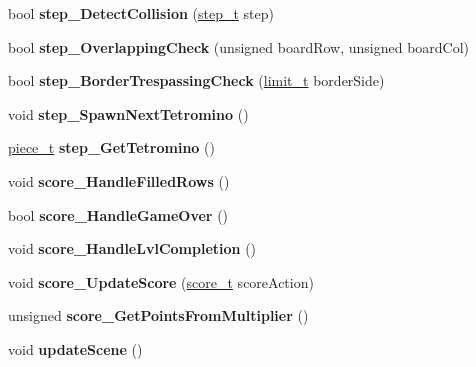 \begin{DoxyCompactItemize}
bool {\bfseries step\+\_\+\+Detect\+Collision} (\hyperlink{TetreesDefs_8hpp_a4d5a793092a473f85b4c1f7faf62afed}{step\+\_\+t} step)
\item 
\mbox{\label{classTetreesEngine_a270b227c9dfbfb72513c6cdfdd910d1b}} 
bool {\bfseries step\+\_\+\+Overlapping\+Check} (unsigned board\+Row, unsigned board\+Col)
\item 
\mbox{\label{classTetreesEngine_aa593f5f688e984a2cdbbf83b162d00a2}} 
bool {\bfseries step\+\_\+\+Border\+Trespassing\+Check} (\hyperlink{TetreesDefs_8hpp_a5dbb1ebfe8a9b95707ac161d3549ed8a}{limit\+\_\+t} border\+Side)
\item 
\mbox{\label{classTetreesEngine_a446196c2260e2ce2ac0d18848ee6b636}} 
void {\bfseries step\+\_\+\+Spawn\+Next\+Tetromino} ()
\item 
\mbox{\label{classTetreesEngine_a94d5fd25eec05994f02bb514496ec66d}} 
\hyperlink{structpiece__t}{piece\+\_\+t} {\bfseries step\+\_\+\+Get\+Tetromino} ()
\item 
\mbox{\label{classTetreesEngine_ad379bf5d98a182411d4d91b12b6ef5ba}} 
void {\bfseries score\+\_\+\+Handle\+Filled\+Rows} ()
\item 
\mbox{\label{classTetreesEngine_a31898b1228f8b0381a82871669503b34}} 
bool {\bfseries score\+\_\+\+Handle\+Game\+Over} ()
\item 
\mbox{\label{classTetreesEngine_aa7d501cb6f73111321e1dadbc140ebc8}} 
void {\bfseries score\+\_\+\+Handle\+Lvl\+Completion} ()
\item 
\mbox{\label{classTetreesEngine_a856a9de6a79138a19b638d9287d7bc72}} 
void {\bfseries score\+\_\+\+Update\+Score} (\hyperlink{TetreesDefs_8hpp_a5a3b4d94c69ae85b911a8dca1afedfe0}{score\+\_\+t} score\+Action)
\item 
\mbox{\label{classTetreesEngine_a848fc0ff4003f3c4d74c11efdc91f0cb}} 
unsigned {\bfseries score\+\_\+\+Get\+Points\+From\+Multiplier} ()
\item 
\mbox{\label{classTetreesEngine_a9aa3eec9561623f77eab13298ddad13c}} 
void {\bfseries update\+Scene} ()
\end{DoxyCompactItemize}
